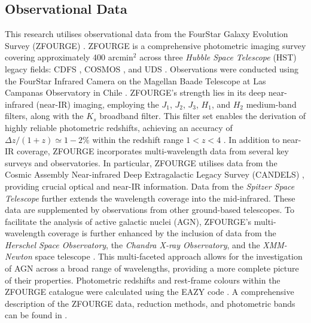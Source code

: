 \documentclass[
  journal=pasa,
  manuscript=research-paper,
  year=202X,
  volume=YY,
]{cup-journal}
\begin{document}
\subsection{Observational Data}
\label{subsec:obsdata}

This research utilises observational data from the FourStar Galaxy Evolution Survey (ZFOURGE) \citep{straatman_fourstar_2016}. ZFOURGE is a comprehensive photometric imaging survey covering approximately 400 arcmin$^2$ across three \textit{Hubble Space Telescope} (HST) legacy fields: CDFS \citep{giacconi_chandra_2002}, COSMOS \citep{scoville_cosmic_2007}, and UDS \citep{lawrence_ukirt_2007}. Observations were conducted using the FourStar Infrared Camera on the Magellan Baade Telescope at Las Campanas Observatory in Chile \citep{persson_fourstar_2013}. ZFOURGE's strength lies in its deep near-infrared (near-IR) imaging, employing the $J_1$, $J_2$, $J_3$, $H_1$, and $H_2$ medium-band filters, along with the $K_s$ broadband filter. This filter set enables the derivation of highly reliable photometric redshifts, achieving an accuracy of $\Delta z/(1+z) \simeq 1-2\%$ within the redshift range $1 < z < 4$ \citep{straatman_fourstar_2016}. In addition to near-IR coverage, ZFOURGE incorporates multi-wavelength data from several key surveys and observatories. In particular, ZFOURGE utilises data from the Cosmic Assembly Near-infrared Deep Extragalactic Legacy Survey (CANDELS) \citep{koekemoer_candels_2011, grogin_candels_2011, skelton_3d-hst_2014}, providing crucial optical and near-IR information. Data from the \textit{Spitzer Space Telescope} \citep{fazio_infrared_2004, rieke_multiband_2004} further extends the wavelength coverage into the mid-infrared. These data are supplemented by observations from other ground-based telescopes. To facilitate the analysis of active galactic nuclei (AGN), ZFOURGE's multi-wavelength coverage is further enhanced by the inclusion of data from the \textit{Herschel Space Observatory}, the \textit{Chandra X-ray Observatory}, and the \textit{XMM-Newton} space telescope \citep{cowley_zfourge_2016, padovani_active_2017}. This multi-faceted approach allows for the investigation of AGN across a broad range of wavelengths, providing a more complete picture of their properties. Photometric redshifts and rest-frame colours within the ZFOURGE catalogue were calculated using the EAZY code \citep{brammer_eazy_2008}. A comprehensive description of the ZFOURGE data, reduction methods, and photometric bands can be found in \citet{straatman_fourstar_2016}.
\end{document}

